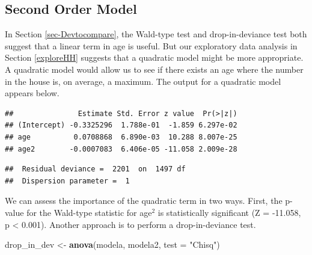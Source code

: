 \documentclass[
]{krantz}
\newenvironment{Shaded}{\begin{snugshade}}{\end{snugshade}}
\newcommand{\DataTypeTok}[1]{\textcolor[rgb]{0.27,0.27,0.27}{#1}}
\newcommand{\KeywordTok}[1]{\textcolor[rgb]{0.27,0.27,0.27}{\textbf{#1}}}
\newcommand{\NormalTok}[1]{#1}
\newcommand{\OperatorTok}[1]{\textcolor[rgb]{0.43,0.43,0.43}{\textbf{#1}}}
\newcommand{\StringTok}[1]{\textcolor[rgb]{0.5,0.5,0.5}{#1}}
\begin{document}
\hypertarget{second-order-model}{%
\subsection{Second Order Model}\label{second-order-model}}

In Section \ref{sec-Devtocompare}, the Wald-type test and drop-in-deviance test both suggest that a linear term in age is useful. But our exploratory data analysis in Section \ref{exploreHH} suggests that a quadratic model might be more appropriate. A quadratic model would allow us to see if there exists an age where the number in the house is, on average, a maximum. The output for a quadratic model appears below.

\begin{Shaded}
\end{Shaded}

\begin{verbatim}
##               Estimate Std. Error z value  Pr(>|z|)
## (Intercept) -0.3325296  1.788e-01  -1.859 6.297e-02
## age          0.0708868  6.890e-03  10.288 8.007e-25
## age2        -0.0007083  6.406e-05 -11.058 2.009e-28
\end{verbatim}

\begin{verbatim}
##  Residual deviance =  2201  on  1497 df 
##  Dispersion parameter =  1
\end{verbatim}

We can assess the importance of the quadratic term in two ways. First, the p-value for the Wald-type statistic for age\(^2\) is statistically significant (Z = -11.058, p \textless{} 0.001). Another approach is to perform a drop-in-deviance test.

\begin{Shaded}
\begin{Highlighting}[]
\NormalTok{drop_in_dev <-}\StringTok{ }\KeywordTok{anova}\NormalTok{(modela, modela2, }\DataTypeTok{test =} \StringTok{"Chisq"}\NormalTok{)}
\end{Highlighting}
\end{Shaded}
\end{document}
